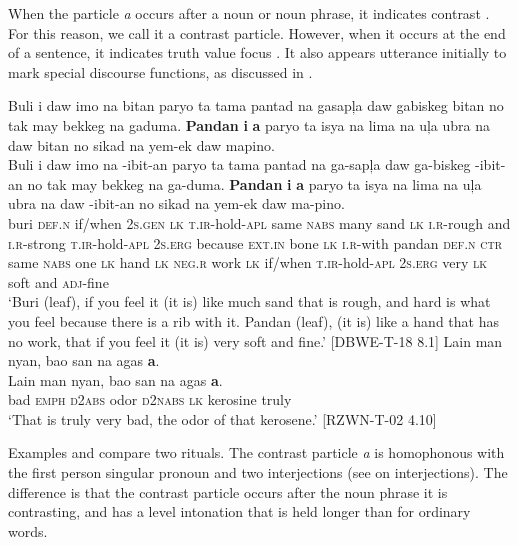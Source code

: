 When the particle \textit{a} occurs after a noun or noun phrase, it indicates contrast . For this reason, we call it a contrast particle. However, when it occurs at the end of a sentence, it indicates truth value focus . It also appears utterance initially to mark special discourse functions, as discussed in .

\ea 
\label{bkm:Ref372900695}
Buli  i  daw  imo  na  bitan  paryo  ta  tama  pantad   na gasapļa  daw  gabiskeg  bitan  no  tak  may  bekkeg  na  gaduma. \textbf{Pandan}  \textbf{i}  \textbf{a}  paryo  ta  isya  na  lima  na  uļa  ubra  na  daw bitan  no  sikad  na  yem-ek  daw  mapino. \\\smallskip
\gll Buli  i  daw  imo  na  \emptyset{}-ibit-an  paryo  ta  tama  pantad   na ga-sapļa  daw  ga-biskeg  \emptyset{}-ibit-an  no  tak  may  bekkeg  na  ga-duma. \textbf{Pandan}  \textbf{i}  \textbf{a}  paryo  ta  isya  na  lima  na  uļa  ubra  na  daw \emptyset{}-ibit-an  no  sikad  na  yem-ek  daw  ma-pino. \\
buri  \textsc{def.n}  if/when  2\textsc{s.gen}  \textsc{lk}  \textsc{t.ir}-hold-\textsc{apl}  same  \textsc{nabs}  many  sand  \textsc{lk} \textsc{i.r}-rough  and  \textsc{i.r}-strong  \textsc{t.ir}-hold-\textsc{apl}  2\textsc{s.erg}  because  \textsc{ext.in}  bone  \textsc{lk}  \textsc{i.r}-with pandan  \textsc{def.n}  \textsc{ctr}  same  \textsc{nabs}  one  \textsc{lk}  hand  \textsc{lk}  \textsc{neg.r}  work  \textsc{lk}  if/when \textsc{t.ir}-hold-\textsc{apl} 2\textsc{s.erg}  very  \textsc{lk}  soft  and  \textsc{adj}-fine \\
\glt `Buri (leaf), if you feel it (it is) like much sand that is rough, and hard is what you feel because there is a rib with it. Pandan (leaf), (it is) like a hand that has no work, that if you feel it (it is) very soft and fine.’ [DBWE-T-18 8.1]
\z
\ea 
\label{bkm:Ref372900724}
Lain  man  nyan,  bao  san  na  agas  \textbf{a}. \\\smallskip
\gll Lain  man  nyan,  bao  san  na  agas  \textbf{a}. \\
bad  \textsc{emph}  \textsc{d}2\textsc{abs}  odor  \textsc{d}2\textsc{nabs}  \textsc{lk}  kerosine  truly \\
\glt ‘That is truly very bad, the odor of that kerosene.’ [RZWN-T-02 4.10]
\z

Examples  and  compare two rituals. The contrast particle \textit{a} is homophonous with the first person singular pronoun and two interjections (see  on interjections). The difference is that the contrast particle occurs after the noun phrase it is contrasting, and has a level intonation that is held longer than for ordinary words.

